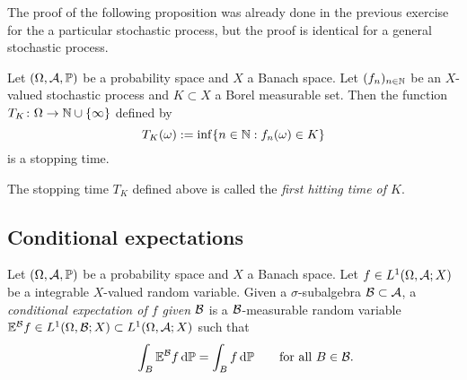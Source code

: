 The proof of the following proposition was already done in the previous exercise for the a particular stochastic process, but the proof is identical for a general stochastic process.

\begin{prop}
  Let $(\Omega, \mathcal{A}, \mathbb{P})$ be a probability space and $X$ a Banach space.
  Let $(f_n)_{n \in \mathbb{N}}$ be an $X$-valued stochastic process and $K \subset X$ a Borel measurable set.
  Then the function $T_K \colon \Omega \rightarrow \mathbb{N} \cup \{\infty\}$ defined by
  \begin{equation*}
    T_K(\omega) := \inf\{n \in \mathbb{N} : f_n(\omega) \in K \}
  \end{equation*}
  is a stopping time.
\end{prop}

The stopping time $T_K$ defined above is called the \emph{first hitting time of $K$}.

\subsection{Conditional expectations}


\begin{defn}\label{defn:conditional-expectation} %
  Let $(\Omega, \mathcal{A}, \mathbb{P})$ be a probability space and $X$ a Banach space.
  Let $f \in L^1(\Omega, \mathcal{A}; X)$ be a integrable $X$-valued random variable.
  Given a $\sigma$-subalgebra $\mathcal{B} \subset \mathcal{A}$, a \emph{conditional expectation of $f$ given $\mathcal{B}$} is a $\mathcal{B}$-measurable random variable $\mathbb{E}^{\mathcal{B}}f \in L^1(\Omega, \mathcal{B}; X) \subset L^1(\Omega,\mathcal{A};X)$ such that
  \begin{equation}\label{eq:conditional-expectation-property}
    \qquad \int_B \mathbb{E}^{\mathcal{B}}f \, \mathrm{d}\mathbb{P} = \int_B f \, \mathrm{d}\mathbb{P} \qquad \text{for all $B \in \mathcal{B}$.}
  \end{equation}
\end{defn}


